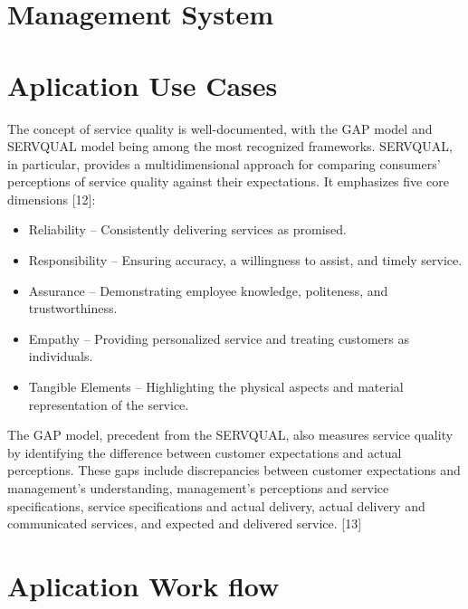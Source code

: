 \section{Management System}

\section{Aplication Use Cases}
The concept of service quality is well-documented, with the GAP model and SERVQUAL model being among the most recognized frameworks. SERVQUAL, in particular, provides a multidimensional approach for comparing consumers’ perceptions of service quality against their expectations. It emphasizes five core dimensions [12]:

\begin{itemize}
    \item Reliability – Consistently delivering services as promised.
    \item Responsibility – Ensuring accuracy, a willingness to assist, and timely service.
    \item Assurance – Demonstrating employee knowledge, politeness, and trustworthiness.
    \item Empathy – Providing personalized service and treating customers as individuals.
    \item Tangible Elements – Highlighting the physical aspects and material representation of the service.
  \end{itemize}

The GAP model, precedent from the SERVQUAL, also measures service quality by identifying the difference between customer expectations and actual perceptions. These gaps include discrepancies between customer expectations and management's understanding, management’s perceptions and service specifications, service specifications and actual delivery, actual delivery and communicated services, and expected and delivered service. [13]

\section{Aplication Work flow}
